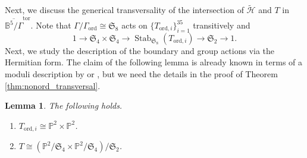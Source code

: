 \documentclass[12pt, pdftex]{amsart}
\theoremstyle{plain}
\newtheorem{lem}[thm]{Lemma}
\theoremstyle{definition}
\numberwithin{equation}{section}
\def\P{{\mathbb P}}
\def\B{{\mathbb B}}
\def\SS{{\mathfrak S}}
\def\Stab{\mathop{\mathrm{Stab}}\nolimits}
\def\ord{\mathrm{ord}}
\def\tor{\mathrm{tor}}
\def\H{\mathscr{H}}
\begin{document}
Next, we discuss the generical transversality of the intersection of $\widetilde{\H}$ and $T$ in $\overline{\B^5/\Gamma}^{\tor}$. 
Note that $\Gamma/\Gamma_{\ord}\cong \SS_8$ acts on $\{T_{\ord,i}\}_{i=1}^{35}$ transitively and
\[1\to \SS_4\times \SS_4\to \Stab_{\SS_8}(T_{\ord,i})\to \SS_2\to 1.\]
Next, we study the description of the boundary and group actions via the Hermitian form.
The claim of the following lemma is already known in terms of a moduli description by \cite[Remark 6]{MS21} or \cite[Example 2.12]{GKS21}, 
but we need the details in the proof of Theorem  \ref{thm:nonord_transversal}.
\begin{lem}
\label{lem:boundary}
The following holds.
\begin{enumerate}
    \item $T_{\ord,i}\cong\P^2\times\P^2$.
    \item $T\cong\left(\P^2/\SS_4\times\P^2/\SS_4\right)/\SS_2$.
\end{enumerate}
\end{lem}
\end{document}

